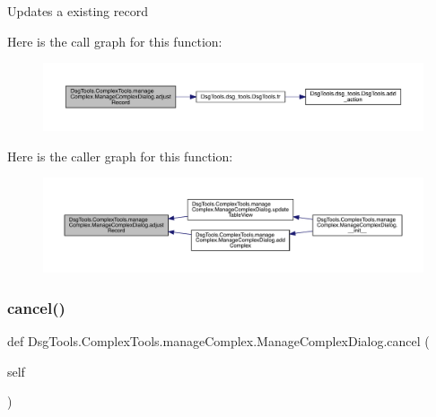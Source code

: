 \begin{DoxyVerb}Updates a existing record
\end{DoxyVerb}
 Here is the call graph for this function\+:
\nopagebreak
\begin{figure}[H]
\begin{center}
\leavevmode
\includegraphics[width=350pt]{class_dsg_tools_1_1_complex_tools_1_1manage_complex_1_1_manage_complex_dialog_a536d61fb7b1a56116abdc3dd21d15924_cgraph}
\end{center}
\end{figure}
Here is the caller graph for this function\+:
\nopagebreak
\begin{figure}[H]
\begin{center}
\leavevmode
\includegraphics[width=350pt]{class_dsg_tools_1_1_complex_tools_1_1manage_complex_1_1_manage_complex_dialog_a536d61fb7b1a56116abdc3dd21d15924_icgraph}
\end{center}
\end{figure}
\mbox{\label{class_dsg_tools_1_1_complex_tools_1_1manage_complex_1_1_manage_complex_dialog_a36d847297beea2c4cea85bcf0c4b6c90}} 
\subsubsection{\texorpdfstring{cancel()}{cancel()}}
{\footnotesize\ttfamily def Dsg\+Tools.\+Complex\+Tools.\+manage\+Complex.\+Manage\+Complex\+Dialog.\+cancel (\begin{DoxyParamCaption}\item[{}]{self }\end{DoxyParamCaption})}

